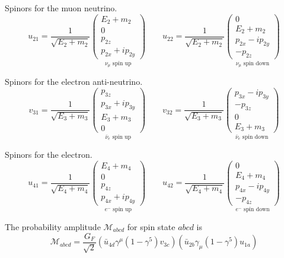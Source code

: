 Spinors for the muon neutrino.
\begin{equation*}
u_{21}=\frac{1}{\sqrt{E_2+m_2}}
\underset{\text{$\nu_\mu$ spin up}}
{\begin{pmatrix}E_2+m_2\\0\\p_{2z}\\p_{2x}+ip_{2y}\end{pmatrix}}
\qquad
u_{22}=\frac{1}{\sqrt{E_2+m_2}}
\underset{\text{$\nu_\mu$ spin down}}
{\begin{pmatrix}0\\E_2+m_2\\p_{2x}-ip_{2y}\\-p_{2z}\end{pmatrix}}
\end{equation*}

Spinors for the electron anti-neutrino.
\begin{equation*}
v_{31}=\frac{1}{\sqrt{E_3+m_3}}
\underset{\text{$\bar{\nu}_e$ spin up}}
{\begin{pmatrix}p_{3z}\\p_{3x}+ip_{3y}\\E_3+m_3\\0\end{pmatrix}}
\qquad
v_{32}=\frac{1}{\sqrt{E_3+m_3}}
\underset{\text{$\bar{\nu}_e$ spin down}}
{\begin{pmatrix}p_{3x}-ip_{3y}\\-p_{3z}\\0\\E_3+m_3\end{pmatrix}}
\end{equation*}

Spinors for the electron.
\begin{equation*}
u_{41}=\frac{1}{\sqrt{E_4+m_4}}
\underset{\text{$e^-$ spin up}}
{\begin{pmatrix}E_4+m_4\\0\\p_{4z}\\p_{4x}+ip_{4y}\end{pmatrix}}
\qquad
u_{42}=\frac{1}{\sqrt{E_4+m_4}}
\underset{\text{$e^-$ spin down}}
{\begin{pmatrix}0\\E_4+m_4\\p_{4x}-ip_{4y}\\-p_{4z}\end{pmatrix}}
\end{equation*}

The probability amplitude $\mathcal{M}_{abcd}$ for spin state $abcd$ is
\begin{equation*}
\mathcal{M}_{abcd}=\frac{G_F}{\sqrt{2}}
\left(
\bar u_{4d}
\gamma^\mu(1-\gamma^5)
v_{3c}
\right)
\left(
\bar u_{2b}
\gamma_\mu(1-\gamma^5)
u_{1a}
\right)
\end{equation*}

